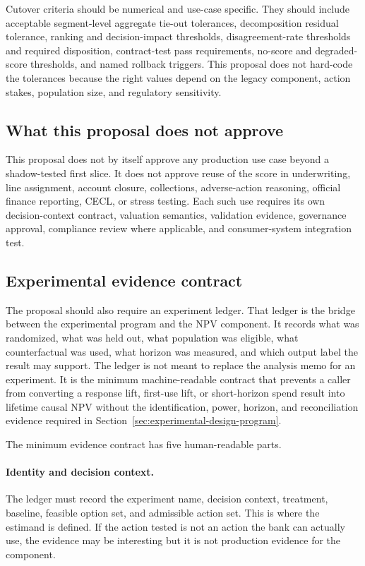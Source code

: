 \documentclass[11pt]{article}
\newcommand{\1}{\mathbf{1}}
\begin{document}
Cutover criteria should be numerical and use-case specific. They should include
acceptable segment-level aggregate tie-out tolerances, decomposition residual
tolerance, ranking and decision-impact thresholds, disagreement-rate thresholds
and required disposition, contract-test pass requirements, no-score and
degraded-score thresholds, and named rollback triggers. This proposal does not
hard-code the tolerances because the right values depend on the legacy
component, action stakes, population size, and regulatory sensitivity.

\subsection{What this proposal does not approve}
\label{subsec:not-approved}

This proposal does not by itself approve any production use case beyond a
shadow-tested first slice. It does not approve reuse of the score in
underwriting, line assignment, account closure, collections, adverse-action
reasoning, official finance reporting, CECL, or stress testing. Each such use
requires its own decision-context contract, valuation semantics, validation
evidence, governance approval, compliance review where applicable, and
consumer-system integration test.

\subsection{Experimental evidence contract}
\label{subsec:experimental-evidence-contract}

The proposal should also require an experiment ledger. That ledger is the
bridge between the experimental program and the NPV component. It records what
was randomized, what was held out, what population was eligible, what
counterfactual was used, what horizon was measured, and which output label the
result may support. The ledger is not meant to replace the analysis memo for
an experiment. It is the minimum machine-readable contract that prevents a
caller from converting a response lift, first-use lift, or short-horizon spend
result into lifetime causal NPV without the identification, power, horizon, and
reconciliation evidence required in
Section~\ref{sec:experimental-design-program}.

The minimum evidence contract has five human-readable parts.

\paragraph{Identity and decision context.}
The ledger must record the experiment name, decision context, treatment,
baseline, feasible option set, and admissible action set. This is where the
estimand is defined. If the action tested is not an action the bank can
actually use, the evidence may be interesting but it is not production evidence
for the component.
\end{document}
